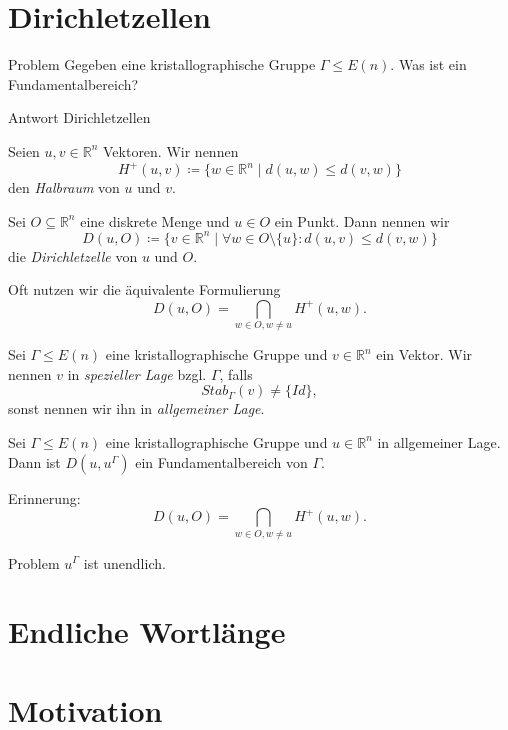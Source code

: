 \documentclass{beamer}
\theoremstyle{plain}
\newcommand\R{\mathbb R}
\begin{document}
\section{Dirichletzellen}
\begin{frame}
    \begin{alertblock}{Problem}
        Gegeben eine kristallographische Gruppe $\Gamma \leq E(n)$. Was ist ein Fundamentalbereich?
    \end{alertblock}
    \pause
    \begin{exampleblock}{Antwort}
        Dirichletzellen
    \end{exampleblock}
\end{frame}

\begin{frame}
    \begin{definition}
        Seien $u, v \in \R^n$ Vektoren. Wir nennen
        $$
            H^+(u, v) \coloneqq \{ w \in \R^n \mid d(u,w) \leq d(v, w) \}
        $$
        den \emph{Halbraum} von $u$ und $v$.
    \end{definition}
    \pause
    \begin{definition}
        Sei $O \subseteq \R^n$ eine diskrete Menge und $u \in O$ ein Punkt.
        Dann nennen wir 
        $$
		    D(u, O) \coloneqq \{ v \in \R^n \mid \forall w \in O \setminus \{ u \} : d(u, v) \leq d(v, w) \}
	    $$
        die \emph{Dirichletzelle} von $u$ und $O$.
    \end{definition} \pause
    Oft nutzen wir die äquivalente Formulierung
    $$
		D(u, O) = \bigcap_{w \in O, w \neq u} H^+(u, w).
	$$
\end{frame}


\begin{frame}
    \begin{definition}
        Sei $\Gamma \leq E(n)$ eine kristallographische Gruppe und $v \in \R^n$ ein Vektor.
        Wir nennen $v$ in \emph{spezieller Lage} bzgl. $\Gamma$, falls 
        $$
            Stab_\Gamma(v) \neq \{Id\},
        $$
        sonst nennen wir ihn in \emph{allgemeiner Lage}.
    \end{definition}
    \pause
    \begin{theorem}
        Sei $\Gamma \leq E(n)$ eine kristallographische Gruppe und $u \in \R^n$ in allgemeiner Lage. Dann ist $D(u, u^\Gamma)$ ein Fundamentalbereich von $\Gamma$.
    \end{theorem}
    \pause
    Erinnerung:
    $$
		D(u, O) = \bigcap_{w \in O, w \neq u} H^+(u, w).
	$$
\end{frame}

\begin{frame}
    \begin{alertblock}{Problem}
        $u^\Gamma$ ist unendlich.
    \end{alertblock}
\end{frame}

\section{Endliche Wortlänge}

\section{Motivation}

\begin{frame}
    \printbibliography
\end{frame}
\end{document}
